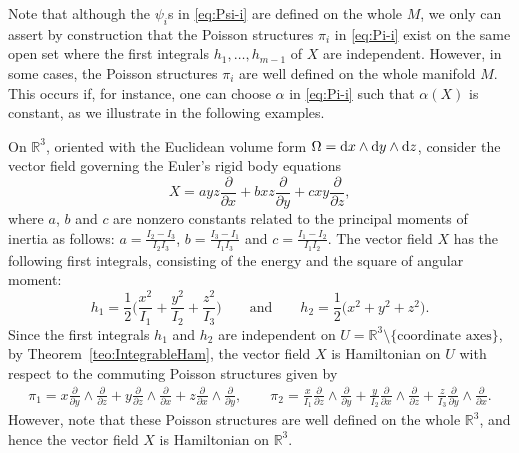 \documentclass[10pt,a4paper]{amsart}
\newcommand{\R}[1]{\mathbb{R}^{#1}}
\newcommand{\dd}{{\rm d}}
\numberwithin{equation}{section}
\begin{document}
Note that although the $\psi_{i}$s in \eqref{eq:Psi-i} are defined on the whole $M$, we only can assert by construction that the Poisson structures $\pi_i$ in \eqref{eq:Pi-i} exist on the same open set where the first integrals $h_1, \dots, h_{m-1}$ of $X$ are independent. However, in some cases, the Poisson structures $\pi_i$ are well defined on the whole manifold $M$. This occurs if, for instance, one can choose $\alpha$ in \eqref{eq:Pi-i} such that $\alpha(X)$ is constant, as we illustrate in the following examples.

\begin{Example}
On $\R{3}$, oriented with the Euclidean volume form $\Omega= \dd x \wedge \dd y \wedge \dd z$, consider the vector field governing the Euler's rigid body equations
 \begin{equation*}
 X = a yz \frac{\partial}{\partial x}+ b xz \frac{\partial}{\partial y} + c xy \frac{\partial}{\partial z},
 \end{equation*}
where $a$, $b$ and $c$ are nonzero constants related to the principal moments of inertia as follows: $a=\frac{I_2-I_3}{I_2I_3}$, $b=\frac{I_3-I_1}{I_1I_3}$ and $c=\frac{I_1-I_2}{I_1I_2}$. The vector field $X$ has the following first integrals, consisting of the energy and the square of angular moment:
 \begin{equation*}
 h_1 = \frac{1}{2}\bigg( \frac{x^2}{I_1} + \frac{y^2}{I_2} + \frac{z^2}{I_3} \bigg) \qquad \text{and} \qquad h_2 = \frac{1}{2}\big( x^2 + y^2 + z^2 \big).
 \end{equation*}
Since the first integrals $h_1$ and $h_2$ are independent on $U=\R{3} \setminus \{\text{coordinate axes}\}$, by Theo\-rem~\ref{teo:IntegrableHam}, the vector field $X$ is Hamiltonian on $U$ with respect to the commuting Poisson structures given by
 \begin{gather*}
 \pi_1 = x\frac{\partial}{\partial y}\!\wedge\! \frac{\partial}{\partial z} + y\frac{\partial}{\partial z}\!\wedge\! \frac{\partial}{\partial x}+z\frac{\partial}{\partial x}\!\wedge\! \frac{\partial}{\partial y},
 \qquad
 \pi_2 = \frac{x}{I_1}\frac{\partial}{\partial z}\!\wedge\! \frac{\partial}{\partial y} + \frac{y}{I_2}\frac{\partial}{\partial x}\!\wedge\! \frac{\partial}{\partial z}+\frac{z}{I_3}\frac{\partial}{\partial y}\!\wedge\! \frac{\partial}{\partial x}.
 \end{gather*}
However, note that these Poisson structures are well defined on the whole $\R{3}$, and hence the vector field $X$ is Hamiltonian on $\R{3}$.
\end{Example}
\end{document}
